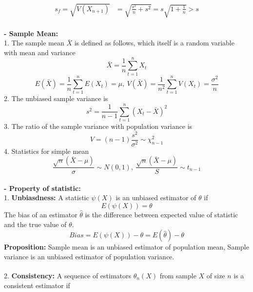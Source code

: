\documentclass{article}
\begin{document}
\begin{enumerate}[S1 - ]
\begin{equation*}
\begin{split}
    s_f = \sqrt{V(X_{n+1})} & = \sqrt{\frac{s^2}{n}+s^2} = s\sqrt{1+\frac{1}{n}} > s
    \end{split}
    \end{equation*}
    \\
    \textbf{- Sample Mean:}\\
    1. The sample mean $\bar{X}$ is defined as follows, which itself is a random variable with mean and variance
    \begin{equation*}
    \bar{X} = \frac{1}{n} \sum_{t=1}^{n} X_t
    \end{equation*}
    \begin{equation*}
    E(\bar{X}) = \frac{1}{n} \sum_{t=1}^{n} E(X_t) =\mu, \ V(\bar{X}) = \frac{1}{n^2} \sum_{t=1}^{n} V(X_t) =\frac{\sigma^2}{n}
    \end{equation*}
    2. The unbiased sample variance is
    \begin{equation*}
    s^2 = \frac{1}{n-1} \sum_{t=1}^{n} (X_t-\bar{X})^2
    \end{equation*}
    3. The ratio of the sample variance with population variance is 
    \begin{equation*}
    V = (n-1)\frac{s^2}{\sigma^2} \sim \chi_{n-1}^2
    \end{equation*}
    4. Statistics for simple mean
    \begin{equation*}
    \frac{\sqrt{n}(\bar{X}-\mu)}{\sigma} \sim N(0,1), \ \frac{\sqrt{n}(\bar{X}-\mu)}{S} \sim t_{n-1}
    \end{equation*}
    \\
    \textbf{- Property of statistic:}\\
    1. \textbf{Unbiasdness:} A statistic $\psi(X)$ is an unbiased estimator of $\theta$ if
    \begin{equation*}
    E(\psi(X))=\theta
    \end{equation*}
    The bias of an estimator $\hat{\theta}$ is the difference between expected value of statistic and the true value of $\theta$.
    \begin{equation*}
    Bias = E(\psi(X)) -\theta = E(\hat{\theta})-\theta
    \end{equation*}
    \textbf{Proposition:} Sample mean is an unbiased estimator of population mean, Sample variance is an unbiased estimator of population variance.\\
    \\
    2. \textbf{Consistency:} A sequence of estimators $\theta_n(X)$ from sample $X$ of size $n$ is a consistent estimator if
    \begin{equation*}

\end{equation*}
\end{enumerate}
\end{document}

